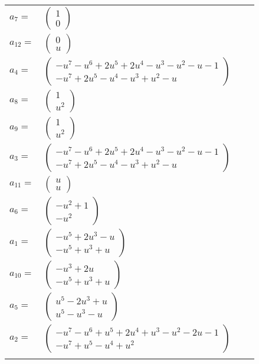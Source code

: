 \documentclass[1p]{elsarticle_modified}
\theoremstyle{definition}
\begin{document}
\begin{tabular}{m{7pt} m{180pt} m{7pt} m{180pt} }
\flushright $a_{7}=$&$\begin{pmatrix}1\\0\end{pmatrix}$ \\
\flushright $a_{12}=$&$\begin{pmatrix}0\\u\end{pmatrix}$ \\
\flushright $a_{4}=$&$\begin{pmatrix}- u^7- u^6+2 u^5+2 u^4- u^3- u^2- u-1\\- u^7+2 u^5- u^4- u^3+u^2- u\end{pmatrix}$ \\
\flushright $a_{8}=$&$\begin{pmatrix}1\\u^2\end{pmatrix}$ \\
\flushright $a_{9}=$&$\begin{pmatrix}1\\u^2\end{pmatrix}$ \\
\flushright $a_{3}=$&$\begin{pmatrix}- u^7- u^6+2 u^5+2 u^4- u^3- u^2- u-1\\- u^7+2 u^5- u^4- u^3+u^2- u\end{pmatrix}$ \\
\flushright $a_{11}=$&$\begin{pmatrix}u\\u\end{pmatrix}$ \\
\flushright $a_{6}=$&$\begin{pmatrix}- u^2+1\\- u^2\end{pmatrix}$ \\
\flushright $a_{1}=$&$\begin{pmatrix}- u^5+2 u^3- u\\- u^5+u^3+u\end{pmatrix}$ \\
\flushright $a_{10}=$&$\begin{pmatrix}- u^3+2 u\\- u^5+u^3+u\end{pmatrix}$ \\
\flushright $a_{5}=$&$\begin{pmatrix}u^5-2 u^3+u\\u^5- u^3- u\end{pmatrix}$ \\
\flushright $a_{2}=$&$\begin{pmatrix}- u^7- u^6+u^5+2 u^4+u^3- u^2-2 u-1\\- u^7+u^5- u^4+u^2\end{pmatrix}$\\&\end{tabular}
\end{document}
